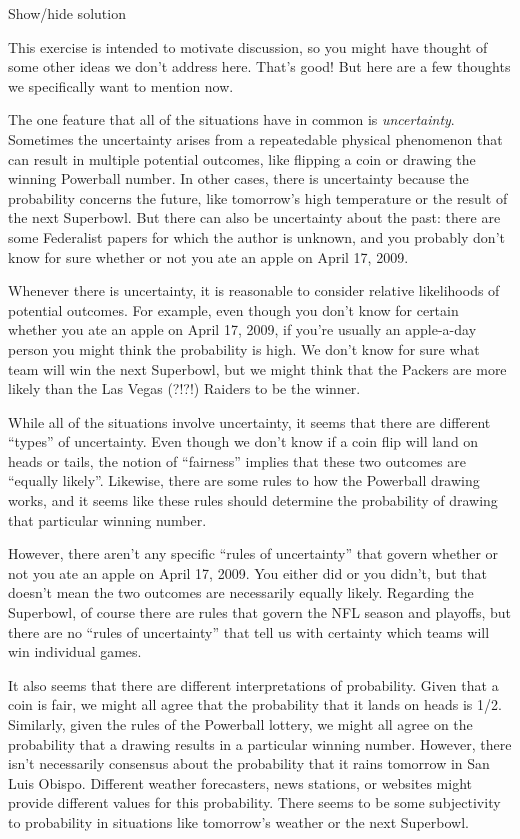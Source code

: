 \documentclass[
]{book}
\theoremstyle{definition}
\theoremstyle{definition}
\theoremstyle{definition}
\theoremstyle{remark}
\begin{document}
Show/hide solution

This exercise is intended to motivate discussion, so you might have thought of some other ideas we don't address here. That's good! But here are a few thoughts we specifically want to mention now.

The one feature that all of the situations have in common is \emph{uncertainty}. Sometimes the uncertainty arises from a repeatedable physical phenomenon that can result in multiple potential outcomes, like flipping a coin or drawing the winning Powerball number. In other cases, there is uncertainty because the probability concerns the future, like tomorrow's high temperature or the result of the next Superbowl. But there can also be uncertainty about the past: there are some Federalist papers for which the author is unknown, and you probably don't know for sure whether or not you ate an apple on April 17, 2009.

Whenever there is uncertainty, it is reasonable to consider relative likelihoods of potential outcomes. For example, even though you don't know for certain whether you ate an apple on April 17, 2009, if you're usually an apple-a-day person you might think the probability is high. We don't know for sure what team will win the next Superbowl, but we might think that the Packers are more likely than the Las Vegas (?!?!) Raiders to be the winner.

While all of the situations involve uncertainty, it seems that there are different ``types'' of uncertainty. Even though we don't know if a coin flip will land on heads or tails, the notion of ``fairness'' implies that these two outcomes are ``equally likely''. Likewise, there are some rules to how the Powerball drawing works, and it seems like these rules should determine the probability of drawing that particular winning number.

However, there aren't any specific ``rules of uncertainty'' that govern whether or not you ate an apple on April 17, 2009. You either did or you didn't, but that doesn't mean the two outcomes are necessarily equally likely. Regarding the Superbowl, of course there are rules that govern the NFL season and playoffs, but there are no ``rules of uncertainty'' that tell us with certainty which teams will win individual games.

It also seems that there are different interpretations of probability. Given that a coin is fair, we might all agree that the probability that it lands on heads is 1/2. Similarly, given the rules of the Powerball lottery, we might all agree on the probability that a drawing results in a particular winning number. However, there isn't necessarily consensus about the probability that it rains tomorrow in San Luis Obispo. Different weather forecasters, news stations, or websites might provide different values for this probability. There seems to be some subjectivity to probability in situations like tomorrow's weather or the next Superbowl.
\end{document}
